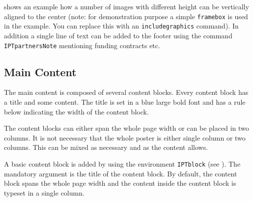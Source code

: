  shows an example how a number of images with different height can be vertically aligned to the center (note: for demonstration purpose a simple \texttt{\bs{}framebox} is used in the example. You can replace this with an \texttt{\bs{}includegraphics} command).
In addition a single line of text can be added to the footer using the command \texttt{\bs{}IPTpartnersNote} mentioning funding contracts etc.




% 




\subsection{Main Content} %

The main content is composed of several content blocks. Every content block has a title and some content. The title is set in a blue large bold font and has a rule below indicating the width of the content block.

The content blocks can either span the whole page width or can be placed in two columns. It is not necessary that the whole poster is either single column or two columns. This can be mixed as necessary and as the content allows.

A basic content block is added by using the environment \texttt{IPTblock} (see ). The mandatory argument is the title of the content block. By default, the content block spans the whole page width and the content inside the content block is typeset in a single column.

% 

